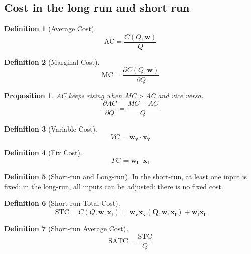 \documentclass{book}
\theoremstyle{plain}
\newtheorem{prop}[thm]{Proposition}
\theoremstyle{definition}
\newtheorem{defn}{Definition}[section]
\theoremstyle{remark}
\begin{document}
\subsection{Cost in the long run and short run}
\begin{defn}[Average Cost]
\begin{equation}
	\text{AC} = \frac{C(Q,\bm{w})}{Q}
\end{equation}
\end{defn}
\begin{defn}[Marginal Cost]
\begin{equation}
	\text{MC} = \frac{\partial C(Q,\bm{w})}{\partial Q}
\end{equation}
\end{defn}

\begin{prop}
AC keeps rising when MC$>$AC and vice versa.
\begin{equation}
	\frac{\partial AC}{\partial Q} = \frac{MC-AC}{Q}
\end{equation}
\end{prop}

\begin{defn}[Variable Cost]
\begin{equation}
	VC  = \bm{w_v}\cdot \bm{x_v}
\end{equation}
\end{defn}
\begin{defn}[Fix Cost]
\begin{equation}
	FC  = \bm{w_f}\cdot \bm{x_f}
\end{equation}
\end{defn}

\begin{defn}[Short-run and Long-run]
In the short-run, at least one input is fixed; in the long-run, all inputs can be adjusted: there is no fixed cost.
\end{defn}

\begin{defn}[Short-run Total Cost]
\begin{equation}
	\text{STC} = C(Q,\bm{w}, \bm{x_f}) = \bm{w_v}\bm{x_v(Q,\bm{w},\bm{x_f})} + \bm{w_f}\bm{x_f}
\end{equation}
\end{defn}

\begin{defn}[Short-run Average Cost]
\begin{equation}
	\text{SATC} = \frac{\text{STC}}{Q}
\end{equation}
\end{defn}
\end{document}
